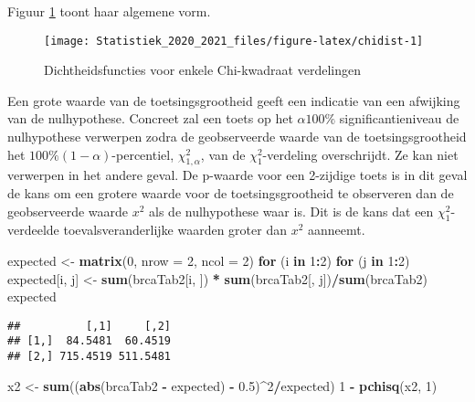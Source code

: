 \documentclass[
  12pt,dutch,coursenotes]{book}
\newenvironment{Shaded}{\begin{snugshade}}{\end{snugshade}}
\newcommand{\ControlFlowTok}[1]{\textcolor[rgb]{0.13,0.29,0.53}{\textbf{#1}}}
\newcommand{\DataTypeTok}[1]{\textcolor[rgb]{0.13,0.29,0.53}{#1}}
\newcommand{\DecValTok}[1]{\textcolor[rgb]{0.00,0.00,0.81}{#1}}
\newcommand{\FloatTok}[1]{\textcolor[rgb]{0.00,0.00,0.81}{#1}}
\newcommand{\KeywordTok}[1]{\textcolor[rgb]{0.13,0.29,0.53}{\textbf{#1}}}
\newcommand{\NormalTok}[1]{#1}
\newcommand{\OperatorTok}[1]{\textcolor[rgb]{0.81,0.36,0.00}{\textbf{#1}}}
\newcommand{\StringTok}[1]{\textcolor[rgb]{0.31,0.60,0.02}{#1}}
\theoremstyle{definition}
\theoremstyle{definition}
\theoremstyle{definition}
\theoremstyle{remark}
\begin{document}
Figuur \ref{fig:chidist} toont haar algemene vorm.

\begin{figure}

{\centering \texttt{[image: Statistiek\_2020\_2021\_files/figure-latex/chidist-1]} 

}

\caption{Dichtheidsfuncties voor enkele Chi-kwadraat verdelingen}\label{fig:chidist}
\end{figure}

Een grote waarde van de toetsingsgrootheid geeft een indicatie van een
afwijking van de nulhypothese. Concreet zal een toets op het \(\alpha 100\%\)
significantieniveau de nulhypothese verwerpen zodra de geobserveerde waarde
van de toetsingsgrootheid het \(100\%(1-\alpha)\)-percentiel, \(\chi^2_{1, \alpha}\), van de \(\chi^2_1\)-verdeling overschrijdt. Ze kan niet verwerpen in
het andere geval. De p-waarde voor een 2-zijdige toets is in dit geval de
kans om een grotere waarde voor de toetsingsgrootheid te observeren dan de
geobserveerde waarde \(x^2\) als de nulhypothese waar is. Dit is de kans dat
een \(\chi^2_1\)-verdeelde toevalsveranderlijke waarden groter dan \(x^2\)
aanneemt.

\begin{Shaded}
\begin{Highlighting}[]
\NormalTok{expected \textless{}{-}}\StringTok{ }\KeywordTok{matrix}\NormalTok{(}\DecValTok{0}\NormalTok{, }\DataTypeTok{nrow =} \DecValTok{2}\NormalTok{, }\DataTypeTok{ncol =} \DecValTok{2}\NormalTok{)}
\ControlFlowTok{for}\NormalTok{ (i }\ControlFlowTok{in} \DecValTok{1}\OperatorTok{:}\DecValTok{2}\NormalTok{) }\ControlFlowTok{for}\NormalTok{ (j }\ControlFlowTok{in} \DecValTok{1}\OperatorTok{:}\DecValTok{2}\NormalTok{) expected[i, j] \textless{}{-}}\StringTok{ }\KeywordTok{sum}\NormalTok{(brcaTab2[i, }
\NormalTok{    ]) }\OperatorTok{*}\StringTok{ }\KeywordTok{sum}\NormalTok{(brcaTab2[, j])}\OperatorTok{/}\KeywordTok{sum}\NormalTok{(brcaTab2)}
\NormalTok{expected}
\end{Highlighting}
\end{Shaded}

\begin{verbatim}
##          [,1]     [,2]
## [1,]  84.5481  60.4519
## [2,] 715.4519 511.5481
\end{verbatim}

\begin{Shaded}
\begin{Highlighting}[]
\NormalTok{x2 \textless{}{-}}\StringTok{ }\KeywordTok{sum}\NormalTok{((}\KeywordTok{abs}\NormalTok{(brcaTab2 }\OperatorTok{{-}}\StringTok{ }\NormalTok{expected) }\OperatorTok{{-}}\StringTok{ }\FloatTok{0.5}\NormalTok{)}\OperatorTok{\^{}}\DecValTok{2}\OperatorTok{/}\NormalTok{expected)}
\DecValTok{1} \OperatorTok{{-}}\StringTok{ }\KeywordTok{pchisq}\NormalTok{(x2, }\DecValTok{1}\NormalTok{)}
\end{Highlighting}
\end{Shaded}
\end{document}
